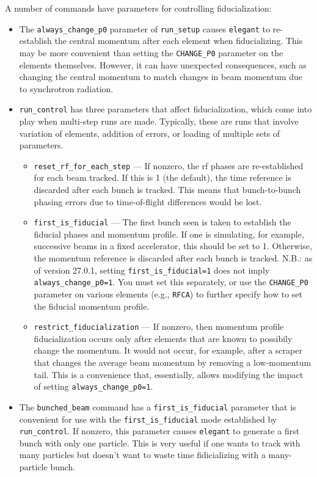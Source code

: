 \documentclass[11pt]{article}
\begin{document}
A number of commands have parameters for controlling fiducialization:
\begin{itemize}
\item The \verb|always_change_p0| parameter of \verb|run_setup| causes
	\verb|elegant| to re-establish the central momentum after each
	element when fiducializing.  This may be more convenient than
	setting the \verb|CHANGE_P0| parameter on the elements themselves.
	However, it can have unexpected consequences, such as changing the
	central momentum to match changes in beam momentum due to synchrotron
	radiation.
\item \verb|run_control| has three parameters that affect fiducialization,
	which come into play when multi-step runs are made.  Typically, these
	are runs that involve variation of elements, addition of errors,
	or loading of multiple sets of parameters.
	\begin{itemize}
	\item \verb|reset_rf_for_each_step| --- If nonzero, the rf phases are 
	re-established
	for each beam tracked.  If this is 1 (the default), 
	the time reference is discarded after each bunch is tracked.
	This means that bunch-to-bunch phasing errors due to time-of-flight 
	differences would be lost.  
	\item \verb|first_is_fiducial| --- The first bunch seen is taken to
	establish the fiducial phases and momentum profile.  If one is simulating,
	for example, successive beams in a fixed accelerator, this should be set
	to 1.  Otherwise, the momentum reference is discarded after each bunch
	is tracked. N.B.: as of version 27.0.1, setting \verb|first_is_fiducial=1| 
        does not imply \verb|always_change_p0=1|. You must set this separately,
        or use the \verb|CHANGE_P0| parameter on various elements (e.g., \verb|RFCA|)
        to further specify how to set the fiducial momentum profile.
	\item \verb|restrict_fiducialization| --- If nonzero, then momentum profile
	fiducialization occurs only after elements that are known to possibily
	change the momentum. It would not occur, for example, after a scraper that
	changes the average beam momentum by removing a low-momentum tail.
        This is a convenience that, essentially, allows modifying the impact
        of setting \verb|always_change_p0=1|.
	\end{itemize}
\item The \verb|bunched_beam| command has a \verb|first_is_fiducial| parameter
	that is convenient for use with the \verb|first_is_fiducial| mode
	established by \verb|run_control|.  If nonzero, this parameter causes
	\verb|elegant| to generate a first bunch with only one particle.
	This is very useful if one wants to track with many particles but doesn't
	want to waste time fidicializing with a many-particle bunch.
\end{itemize}
\end{document}
